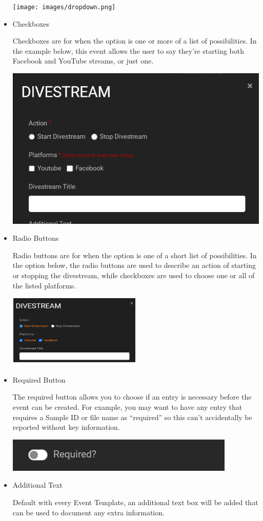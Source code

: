 \documentclass[
  letterpaper,
  DIV=11,
  numbers=noendperiod]{scrreprt}
\begin{document}
\begin{itemize}
  \texttt{[image: images/dropdown.png]}
\item
  Checkboxes

  Checkboxes are for when the option is one or more of a list of
  possibilities. In the example below, this event allows the user to say
  they're starting both Facebook and YouTube streams, or just one.

  \includegraphics{images/image23.png}
\item
  Radio Buttons

  Radio buttons are for when the option is one of a short list of
  possibilities. In the option below, the radio buttons are used to
  describe an action of starting or stopping the divestream, while
  checkboxes are used to choose one or all of the listed platforms.

  \includegraphics{images/radio.png}
\item
  Required Button

  The required button allows you to choose if an entry is necessary
  before the event can be created. For example, you may want to have any
  entry that requires a Sample ID or file name as ``required'' so this
  can't accidentally be reported without key information.

  \includegraphics{images/image7.png}
\item
  Additional Text

  Default with every Event Template, an additional text box will be
  added that can be used to document any extra information.
\end{itemize}
\end{document}
